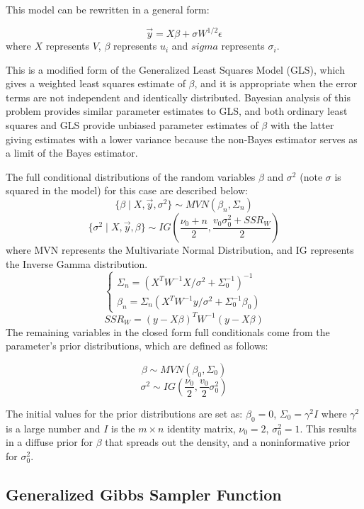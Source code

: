 \documentclass[12pt,twoside]{dukestatscithesis}
\theoremstyle{definition}
\theoremstyle{definition}
\theoremstyle{definition}
\theoremstyle{remark}
\begin{document}
This model can be rewritten in a general form:

\[\vec{y} = X\beta + \sigma W^{1/2}\epsilon\] where \(X\) represents
\(V\), \(\beta\) represents \(u_i\) and \(sigma\) represents
\(\sigma_i\).

This is a modified form of the Generalized Least Squares Model (GLS),
which gives a weighted least squares estimate of \(\beta\), and it is
appropriate when the error terms are not independent and identically
distributed. Bayesian analysis of this problem provides similar
parameter estimates to GLS, and both ordinary least squares and GLS
provide unbiased parameter estimates of \(\beta\) with the latter giving
estimates with a lower variance because the non-Bayes estimator serves
as a limit of the Bayes estimator.

The full conditional distributions of the random variables \(\beta\) and
\(\sigma^2\) (note \(\sigma\) is squared in the model) for this case are
described below:
\[\{\beta \mid X, \vec{y}, \sigma^2\} \sim MVN (\beta_n, \Sigma_n)\]
\[\{\sigma^2 \mid X, \vec{y}, \beta\} \sim IG (\frac{\nu_0 + n}{2}, \frac{v_0\sigma^2_0 + SSR_W}{2})\]
where MVN represents the Multivariate Normal Distribution, and IG
represents the Inverse Gamma distribution. \[ \begin{cases}
      \Sigma_n = (X^TW^{-1}X/\sigma^2+\Sigma_0^{-1})^{-1}\\
      \beta_n = \Sigma_n(X^TW^{-1}y/\sigma^2 + \Sigma_0^{-1} \beta_0)
    \end{cases}\] \[SSR_W = (y - X\beta)^TW^{-1}(y-X\beta)\]
The remaining variables in the closed form full conditionals come from
the parameter's prior distributions, which are defined as follows:

\[\beta \sim MVN (\beta_0, \Sigma_0)\]
\[\sigma^2 \sim IG (\frac{\nu_0}{2}, \frac{v_0}{2}\sigma_0^2)\]

The initial values for the prior distributions are set as:
\(\beta_0 = 0\), \(\Sigma_0 = \gamma^2I\) where \(\gamma^2\) is a large
number and \(I\) is the \(m \times n\) identity matrix, \(\nu_0 = 2\),
\(\sigma_0^2 = 1\). This results in a diffuse prior for \(\beta\) that
spreads out the density, and a noninformative prior for \(\sigma^2_0\).

\subsection{Generalized Gibbs Sampler
Function}\label{generalized-gibbs-sampler-function}
\end{document}
